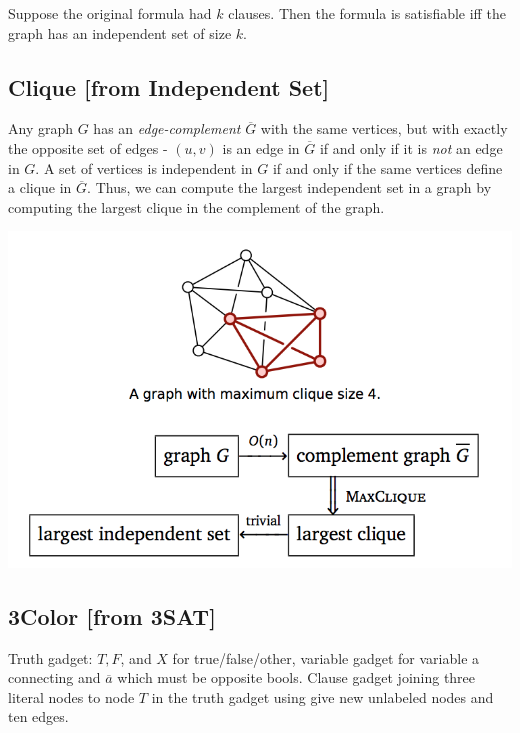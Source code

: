 Suppose the original formula had $k$ clauses. Then the formula is satisfiable iff the graph has an independent set of size $k$.

\subsection{Clique [from Independent Set]}
Any graph $G$ has an \emph{edge-complement} $\overline{G}$ with the same vertices, but with exactly the opposite set of edges - $(u, v)$ is an edge in $\overline{G}$ if and only if it is \emph{not} an edge in $G$. A set of vertices is independent in $G$ if and only if the same vertices define a clique in $\overline{G}$. Thus, we can compute the largest independent set in a graph by computing the largest clique in the complement of the graph.

\includegraphics[width=\linewidth]{images/maxclique.png}

\subsection{3Color [from 3SAT]}

Truth gadget: $T,F$, and $X$ for true/false/other, variable gadget for variable a connecting and $\overbar{a}$ which must be opposite bools. Clause gadget joining three literal nodes to node $T$ in the truth gadget using give new unlabeled nodes and ten edges.